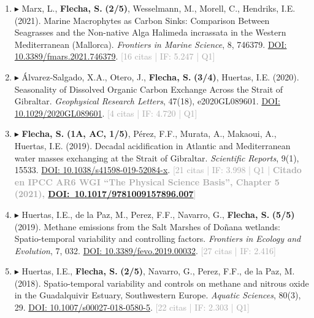 \documentclass[11pt,a4paper]{article}
\begin{document}
\begin{enumerate}[leftmargin=*]
\item $\blacktriangleright$ Marx, L., \textbf{Flecha, S.} \textbf{(2/5)}, Wesselmann, M., Morell, C., Hendriks, I.E. (2021). Marine Macrophytes as Carbon Sinks: Comparison Between Seagrasses and the Non-native Alga Halimeda incrassata in the Western Mediterranean (Mallorca). \textit{Frontiers in Marine Science}, 8, 746379. \href{https://doi.org/10.3389/fmars.2021.746379}{DOI: 10.3389/fmars.2021.746379}. \textcolor{darkgray}{\small [16 citas | IF: 5.247 | Q1]}

\item $\blacktriangleright$ Álvarez-Salgado, X.A., Otero, J., \textbf{Flecha, S.} \textbf{(3/4)}, Huertas, I.E. (2020). Seasonality of Dissolved Organic Carbon Exchange Across the Strait of Gibraltar. \textit{Geophysical Research Letters}, 47(18), e2020GL089601. \href{https://doi.org/10.1029/2020GL089601}{DOI: 10.1029/2020GL089601}. \textcolor{darkgray}{\small [4 citas | IF: 4.720 | Q1]}

\item $\blacktriangleright$ \textbf{Flecha, S.} \textbf{(1A, AC, 1/5)}, Pérez, F.F., Murata, A., Makaoui, A., Huertas, I.E. (2019). Decadal acidification in Atlantic and Mediterranean water masses exchanging at the Strait of Gibraltar. \textit{Scientific Reports}, 9(1), 15533. \href{https://doi.org/10.1038/s41598-019-52084-x}{DOI: 10.1038/s41598-019-52084-x}. \textcolor{darkgray}{\small [21 citas | IF: 3.998 | Q1 | \textbf{Citado en IPCC AR6 WGI ``The Physical Science Basis'', Chapter 5 (2021), \href{https://www.ipcc.ch/report/ar6/wg1/downloads/report/IPCC_AR6_WGI_Chapter05_SM.pdf}{DOI:~10.1017/9781009157896.007}}]}

\item $\blacktriangleright$ Huertas, I.E., de la Paz, M., Perez, F.F., Navarro, G., \textbf{Flecha, S.} \textbf{(5/5)} (2019). Methane emissions from the Salt Marshes of Doñana wetlands: Spatio-temporal variability and controlling factors. \textit{Frontiers in Ecology and Evolution}, 7, 032. \href{https://doi.org/10.3389/fevo.2019.00032}{DOI: 10.3389/fevo.2019.00032}. \textcolor{darkgray}{\small [27 citas | IF: 2.416]}

\item $\blacktriangleright$ Huertas, I.E., \textbf{Flecha, S.} \textbf{(2/5)}, Navarro, G., Perez, F.F., de la Paz, M. (2018). Spatio-temporal variability and controls on methane and nitrous oxide in the Guadalquivir Estuary, Southwestern Europe. \textit{Aquatic Sciences}, 80(3), 29. \href{https://doi.org/10.1007/s00027-018-0580-5}{DOI: 10.1007/s00027-018-0580-5}. \textcolor{darkgray}{\small [22 citas | IF: 2.303 | Q1]}


\end{enumerate}
\end{document}
